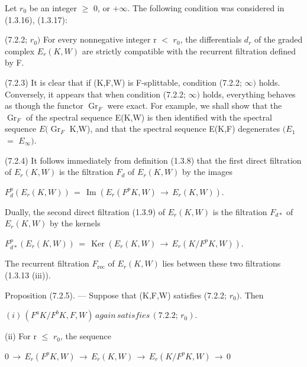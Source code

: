 \documentclass[11pt,twoside]{article}
\newcommand{\DFormula}[1]{%
  \par\smallskip\noindent\hspace*{0pt}\(\displaystyle #1\)\par\smallskip
}
\begin{document}
Let \(r_{0}\) be an integer \(\geq \) 0, or \(+\infty \). The following condition was considered in (1.3.16), (1.3.17):\par
\par\medskip
(7.2.2; \(r_{0})\) For every nonnegative integer r \(<\) \(r_{0}\), the differentials \(d_{r}\) of the graded complex \(E_{r}(K,W)\) are strictly compatible with the recurrent filtration defined by F.\par
\par\medskip
(7.2.3) It is clear that if (K,F,W) is F-splittable, condition (7.2.2; \(\infty )\) holds. Conversely, it appears that when condition (7.2.2; \(\infty )\) holds, everything behaves as though the functor \(\operatorname{Gr}_{F}\) were exact. For example, we shall show that the \(\operatorname{Gr}_{F}\) of the spectral sequence E(K,W) is then identified with the spectral sequence \(E(\operatorname{Gr}_{F}\) K,W), and that the spectral sequence E(K,F) degenerates \((E_{1}\) \(=\) \(E_{\infty })\).\par
\par\medskip
(7.2.4) It follows immediately from definition (1.3.8) that the first direct filtration of \(E_{r}(K,W)\) is the filtration \(F_{d}\) of \(E_{r}(K,W)\) by the images\par
\par\medskip
\DFormula{F_{d}^{p}(E_{r}(K,W))\,=\,\operatorname{Im}(E_{r}(F^{p}K,W)\,\to \,E_{r}(K,W)).}
\par\medskip
Dually, the second direct filtration (1.3.9) of \(E_{r}(K,W)\) is the filtration \(F_{d\ast }\) of \(E_{r}(K,W)\) by the kernels\par
\par\medskip
\DFormula{F_{d\ast }^{p}(E_{r}(K,W))\,=\,\operatorname{Ker}(E_{r}(K,W)\,\to \,E_{r}(K/F^{p}K,W)).}
\par\medskip
The recurrent filtration \(F_{\mathrm{rec}}\) of \(E_{r}(K,W)\) lies between these two filtrations (1.3.13 (iii)).\par
\par\medskip
Proposition (7.2.5). — Suppose that (K,F,W) satisfies (7.2.2; \(r_{0})\). Then\par
\par\medskip
\DFormula{(i)\,(F^{a}K/F^{b}K,F,W)\,again\,satisfies\,(7.2.2;\,r_{0}).}
\par\medskip
(ii) For r \(\leq \) \(r_{0}\), the sequence\par
\par\medskip
\DFormula{0\,\to \,E_{r}(F^{p}K,W)\,\to \,E_{r}(K,W)\,\to \,E_{r}(K/F^{p}K,W)\,\to \,0}
\end{document}
